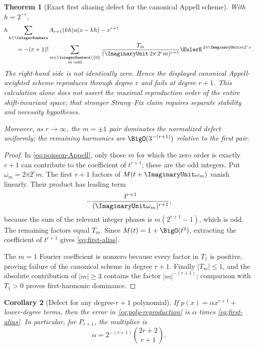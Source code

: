\documentclass[11pt,oneside]{article}
\newtheorem{theorem}{Theorem}[section]
\newtheorem{corollary}[theorem]{Corollary}
\theoremstyle{definition}
\theoremstyle{remark}
\begin{document}
\begin{theorem}[Exact first aliasing defect for the canonical Appell scheme]
\label{thm:alias-defect}
With \(h=2^{-r}\),
\begin{align}
 &h\sum_{k\in\IntegerNumbers}A_{r+1}(kh)u(x-kh)-x^{r+1}
 \notag\\
 &\qquad=
 -(r+1)!
 \sum_{\substack{m\in\IntegerNumbers\setminus\{0\}\\m\ {\rm odd}}}
 \frac{T_m}
      {(\ImaginaryUnit\,2\pi\,2^r m)^{r+1}}
 \EulerE^{\,2\pi\ImaginaryUnit m2^rx}.
 \label{eq:first-alias}
\end{align}
The right-hand side is not identically zero.  Hence the displayed canonical
Appell-weighted scheme reproduces through degree \(r\) and fails at degree
\(r+1\).  This calculation alone does not assert the maximal reproduction
order of the entire shift-invariant space; that stronger Strang--Fix claim
requires separate stability and necessity hypotheses.

Moreover, as \(r\to\infty\), the \(m=\pm1\) pair dominates the normalized
defect uniformly; the remaining harmonics are
\(\BigO(3^{-(r+1)})\) relative to the first pair.
\end{theorem}

\begin{proof}
In \eqref{eq:poisson-Appell}, only those \(m\) for which the zero order is
exactly \(r+1\) can contribute to the coefficient of \(t^{r+1}\); these are
the odd integers.  Put \(\omega_m=2\pi2^rm\).  The first \(r+1\) factors of
\(M(t+\ImaginaryUnit\omega_m)\) vanish linearly.  Their product has leading term
\[
 -\frac{t^{r+1}}{(\ImaginaryUnit\omega_m)^{r+1}},
\]
because the sum of the relevant integer phases is
\(m(2^{r+1}-1)\), which is odd.  The remaining factors equal \(T_m\).
Since \(M(t)=1+\BigO(t^2)\), extracting the coefficient of \(t^{r+1}\)
gives \eqref{eq:first-alias}.

The \(m=1\) Fourier coefficient is nonzero because every factor in \(T_1\)
is positive, proving failure of the canonical scheme in degree \(r+1\).
Finally \(|T_m|\leq1\), and the absolute
contribution of \(|m|\geq3\) contains the factor
\(|m|^{-(r+1)}\); comparison with \(T_1>0\) proves first-harmonic dominance.
\end{proof}

\begin{corollary}[Defect for any degree-\(r+1\) polynomial]
If \(p(x)=\alpha x^{r+1}+\) lower-degree terms, then the error in
\eqref{eq:poly-reproduction} is \(\alpha\) times
\eqref{eq:first-alias}.  In particular, for \(P_{r+1}\), the multiplier is
\[
 \alpha=2^{-(r+1)}\binom{2r+2}{r+1}.
\]
\end{corollary}
\end{document}
